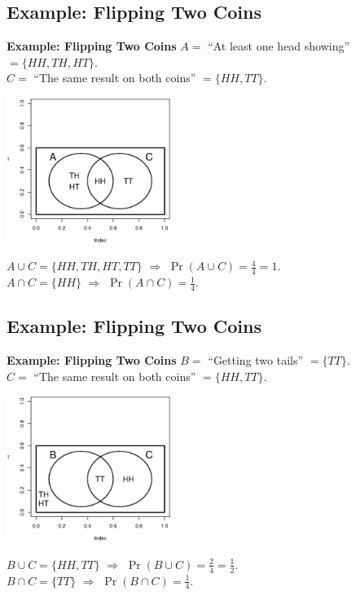 \documentclass[compress]{beamer}        %
\makeatletter
\newcommand{\tcb}{\textcolor{beamer@blendedblue}}
\makeatother
\begin{document}
\subsection{Example: Flipping Two Coins}
\begin{frame}{\bf \tcb{Example: Flipping Two Coins}}
$A =$ ``At least one head showing'' $= \{HH, TH, HT\}$.\\[0.2cm]
$C =$ ``The same result on both coins'' $= \{HH, TT\}$.
\begin{center}
\includegraphics[width=0.4\textwidth, trim = 2.2cm 2.9cm 1.4cm 6cm, clip]{TwoCoins}
\end{center}
$A \cup C = \{HH, TH, HT, TT\}$ $\Rightarrow$ $\Pr(A \cup C) = \tfrac{4}{4} = 1$.\\[0.2cm]
$A \cap C = \{HH\}$ $\Rightarrow$ $\Pr(A \cap C) = \tfrac{1}{4}$.

\end{frame}


\subsection{Example: Flipping Two Coins}
\begin{frame}{\bf \tcb{Example: Flipping Two Coins}}\label{vennexample}
$B =$ ``Getting two tails'' $= \{TT\}$.\\[0.2cm]
$C =$ ``The same result on both coins'' $= \{HH, TT\}$.
\begin{center}
\includegraphics[width=0.4\textwidth, trim = 2.2cm 2.9cm 1.4cm 6cm, clip]{TwoCoins2}
\end{center}
$B \cup C = \{HH, TT\}$ $\Rightarrow$ $\Pr(B \cup C) = \tfrac{2}{4} = \tfrac{1}{2}$.\\[0.2cm]
$B \cap C = \{TT\}$ $\Rightarrow$ $\Pr(B \cap C) = \tfrac{1}{4}$.

\end{frame}
\end{document}
